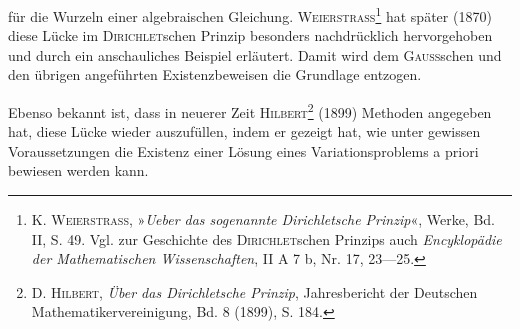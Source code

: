 für die Wurzeln einer algebraischen Gleichung. \textsc{Weierstrass}\footnote{K. \textsc{Weierstrass}, »\textit{Ueber das sogenannte Dirichletsche Prinzip}«, Werke, Bd. II, S. 49. Vgl. zur
Geschichte des \textsc{Dirichlet}schen Prinzips auch \textit{Encyklopädie der Mathematischen Wissenschaften}, II A 7 b,
Nr. 17, 23—25.} hat später
(1870) diese Lücke im \textsc{Dirichlet}schen Prinzip besonders nachdrücklich hervorgehoben und durch ein anschauliches Beispiel erläutert. Damit wird dem \textsc{Gauss}schen und den übrigen angeführten Existenzbeweisen die Grundlage entzogen.
\par\noindent\hspace*{\parindent}Ebenso bekannt ist, dass in neuerer Zeit \textsc{Hilbert}\footnote{D. \textsc{Hilbert}, \textit{Über das Dirichletsche Prinzip}, Jahresbericht der Deutschen Mathematikervereinigung,
Bd. 8 (1899), S. 184.} (1899) Methoden
\clearpage{}
\noindent angegeben hat, diese Lücke wieder auszufüllen, indem er gezeigt hat, wie
unter gewissen Voraussetzungen die Existenz einer Lösung eines Variationsproblems a priori bewiesen werden kann.
\clearpage\endgroup
